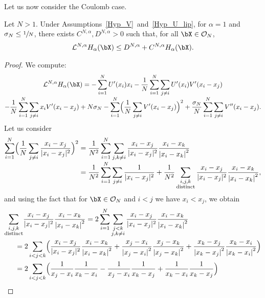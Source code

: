 Let us now consider the Coulomb case.
\begin{lemma}\label{lya_alpha_1}
Let $N>1$. Under Assumptions~\ref{Hyp_V}~and~\ref{Hyp_U_lip}, for $\alpha=1$ and $\sigma_N\leq\sfrac{1}{N}$, there exists $C^{N,\alpha}, D^{N,\alpha}>0$ such that, for all $\bX\in\mathcal{O}_N$,
\begin{align*}
\mathcal{L}^{N,\alpha} H_{\alpha}(\bX)\leq D^{N,\alpha}+C^{N,\alpha}H_{\alpha}(\bX).
\end{align*}
\end{lemma}

\begin{proof}
We compute:\vspace*{-7pt}
\begin{multline*}
\mathcal{L}^{N,\alpha} H_{\alpha}(\bX)=-\sum_{i=1}^N U'(x_i)x_i-\frac{1}{N}\sum_{i=1}^N\sum_{j\neq i}U'(x_i)V'(x_i-x_j)\\[-3pt]
-\frac{1}{N}\sum_{i=1}^N\sum_{j\neq i}x_iV'(x_i-x_j)+N\sigma_N-\sum_{i=1}^N\Bigl(\frac{1}{N}\sum_{j\neq i}V'(x_i-x_j)\Bigr)^2+\frac{\sigma_N}{N}\sum_{i=1}^N\sum_{j\neq i}V''(x_i-x_j).
\end{multline*}
Let us consider
\begin{align*}
\sum_{i=1}^N\Bigl(\frac{1}{N}\sum_{j\neq i}\frac{x_i-x_j}{|x_i-x_j|^2}\Bigr)^2&=\frac{1}{N^2}\sum_{i=1}^N\sum_{j,k\neq i}\frac{x_i-x_j}{|x_i-x_j|^2}\frac{x_i-x_k}{\left|x_i-x_k\right|^2}\\[-3pt]
&=\frac{1}{N^2}\sum_{i=1}^N\sum_{j\neq i}\frac{1}{|x_i-x_j|^2}+\frac{1}{N^2}\sum_{\substack{i,j,k\\\text{distinct}}}\frac{x_i-x_j}{|x_i-x_j|^2}\frac{x_i-x_k}{\left|x_i-x_k\right|^2},
\end{align*}
and using the fact that for $\bX\in\mathcal{O}_N$ and $i<j$ we have $x_i<x_j$, we obtain
\begin{align*}
\sum_{\substack{i,j,k\\\text{distinct}}}&\frac{x_i-x_j}{|x_i-x_j|^2}\frac{x_i-x_k}{\left|x_i-x_k\right|^2}
=2\sum_{i=1}^N\sum_{\substack{j<k\\ j,k\neq i}}\frac{x_i-x_j}{|x_i-x_j|^2}\frac{x_i-x_k}{\left|x_i-x_k\right|^2}\\
&\hspace*{-.4cm}=2\sum_{i<j<k}\Bigl(\frac{x_i-x_j}{|x_i-x_j|^2}\frac{x_i-x_k}{\left|x_i-x_k\right|^2}+\frac{x_j-x_i}{\left|x_j-x_i\right|^2}\frac{x_j-x_k}{\left|x_j-x_k\right|^2}+\frac{x_k-x_j}{\left|x_k-x_j\right|^2}\frac{x_k-x_i}{\left|x_k-x_i\right|^2}\Bigr)\\
&\hspace*{-.4cm}=2\sum_{i<j<k}\Bigl(\frac{1}{x_j-x_i}\frac{1}{x_k-x_i}-\frac{1}{x_j-x_i}\frac{1}{x_k-x_j}+\frac{1}{x_k-x_i}\frac{1}{x_k-x_j}\Bigr)\\

\end{align*}
\end{proof}
